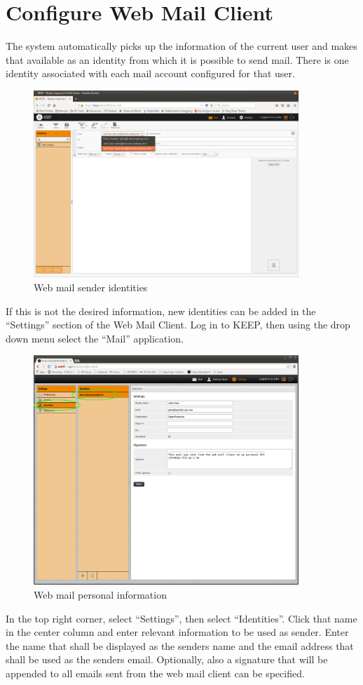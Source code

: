 \documentclass[12pt,a4paper,titlepage]{article}
\begin{document}
\newpage
\section{Configure Web Mail Client}
The system automatically picks up the information of the current user and makes that available as an identity from which it is possible to send mail. There is one identity associated with each mail account configured for that user.
\begin{figure}[h!]
\centering
\includegraphics[width=10cm]{./img/webmail-send-identities}
\caption{Web mail sender identities}
\end{figure}
\FloatBarrier

If this is not the desired information, new identities can be added in the ``Settings'' section of the Web Mail Client.
Log in to KEEP, then using the drop down menu select the ``Mail'' application.
\begin{figure}[h!]
\centering
\includegraphics[width=10cm]{./img/webmail-config}
\caption{Web mail personal information}
\end{figure}
In the top right corner, select ``Settings'', then select ``Identities''.
Click that name in the center column and enter relevant information to be used as sender.
Enter the name that shall be displayed as the senders name and the email address that shall be used as the senders email.
Optionally, also a signature that will be appended to all emails sent from the web mail client can be specified.
\end{document}
